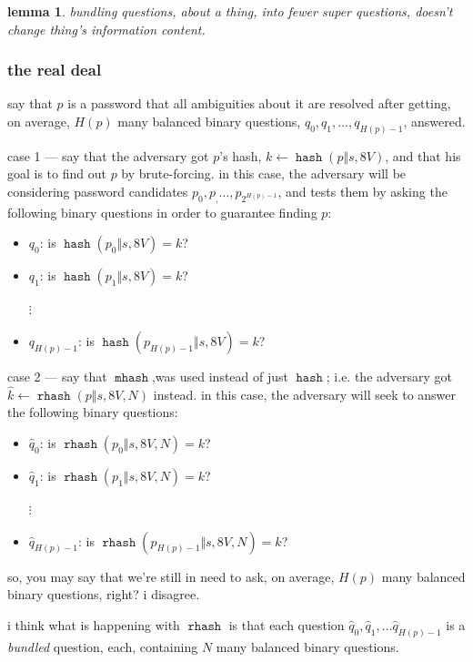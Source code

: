 \documentclass[twocolumn]{article}
\newtheorem{lemma}{lemma}
\DeclareMathOperator{\hash}{\mathtt{hash}}
\DeclareMathOperator{\rhash}{\mathtt{rhash}}
\DeclareMathOperator{\mhash}{\mathtt{mhash}}
\begin{document}
\begin{lemma}
    bundling questions, about a thing, into fewer super questions, doesn't
    change thing's information content.
\end{lemma}

\subsubsection{the real deal}
say that $p$ is a password that all ambiguities about it are resolved after
getting, on average, $H(p)$ many balanced binary questions, $q_0, q_1,
\ldots, q_{H(p)-1}$, answered.

case 1 --- say that the adversary got $p$'s hash, $k \gets \hash(p \Vert s,
8V)$, and that his goal is to find out $p$ by brute-forcing.  in this case,
the adversary will be considering password candidates $p_0, p_, \ldots,
p_{2^{H(p)-1}}$, and tests them by asking the following binary questions in
order to guarantee finding $p$:
\begin{itemize}
    \item $q_0$: is $\hash(p_0 \Vert s, 8V) = k$?
    \item $q_1$: is $\hash(p_1 \Vert s, 8V) = k$?

    $\vdots$

    \item $q_{H(p)-1}$: is $\hash(p_{H(p)-1} \Vert s, 8V) = k$?
\end{itemize}

case 2 --- say that $\mhash$,was used instead of just $\hash$;  i.e. the
adversary got $\hat k \gets \rhash(p \Vert s, 8V, N)$ instead.  in this
case, the adversary will seek to answer the following binary questions:
\begin{itemize}
    \item $\hat q_0$: is $\rhash(p_0 \Vert s, 8V, N) = k$?
    \item $\hat q_1$: is $\rhash(p_1 \Vert s, 8V, N) = k$?

    $\vdots$

    \item $\hat q_{H(p)-1}$: is $\rhash(p_{H(p)-1} \Vert s, 8V, N) = k$?
\end{itemize}

so, you may say that we're still in need to ask, on average, $H(p)$ many
balanced binary questions, right?  i disagree.

i think what is happening with $\rhash$ is that each question $\hat q_0,
\hat q_1, \ldots \hat q_{H(p)-1}$ is a \emph{bundled} question, each,
containing $N$ many balanced binary questions.
\end{document}
